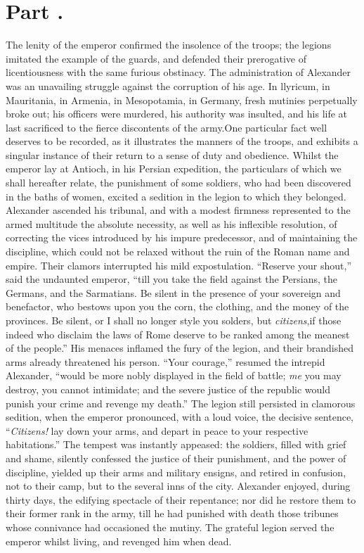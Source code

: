 \section{Part \thesection.}
\thispagestyle{simple}

The lenity of the emperor confirmed the insolence of the troops;
the legions imitated the example of the guards, and defended
their prerogative of licentiousness with the same furious
obstinacy. The administration of Alexander was an unavailing
struggle against the corruption of his age. In llyricum, in
Mauritania, in Armenia, in Mesopotamia, in Germany, fresh
mutinies perpetually broke out; his officers were murdered, his
authority was insulted, and his life at last sacrificed to the
fierce discontents of the army.\footnotemark[76] One particular fact well
deserves to be recorded, as it illustrates the manners of the
troops, and exhibits a singular instance of their return to a
sense of duty and obedience. Whilst the emperor lay at Antioch,
in his Persian expedition, the particulars of which we shall
hereafter relate, the punishment of some soldiers, who had been
discovered in the baths of women, excited a sedition in the
legion to which they belonged. Alexander ascended his tribunal,
and with a modest firmness represented to the armed multitude the
absolute necessity, as well as his inflexible resolution, of
correcting the vices introduced by his impure predecessor, and of
maintaining the discipline, which could not be relaxed without
the ruin of the Roman name and empire. Their clamors interrupted
his mild expostulation. “Reserve your shout,” said the undaunted
emperor, “till you take the field against the Persians, the
Germans, and the Sarmatians. Be silent in the presence of your
sovereign and benefactor, who bestows upon you the corn, the
clothing, and the money of the provinces. Be silent, or I shall
no longer style you solders, but \textit{citizens},\footnotemark[77] if those indeed
who disclaim the laws of Rome deserve to be ranked among the
meanest of the people.” His menaces inflamed the fury of the
legion, and their brandished arms already threatened his person.
“Your courage,” resumed the intrepid Alexander, “would be more
nobly displayed in the field of battle; \textit{me} you may destroy, you
cannot intimidate; and the severe justice of the republic would
punish your crime and revenge my death.” The legion still
persisted in clamorous sedition, when the emperor pronounced,
with a loud voice, the decisive sentence, “\textit{Citizens!} lay down
your arms, and depart in peace to your respective habitations.”
The tempest was instantly appeased: the soldiers, filled with
grief and shame, silently confessed the justice of their
punishment, and the power of discipline, yielded up their arms
and military ensigns, and retired in confusion, not to their
camp, but to the several inns of the city. Alexander enjoyed,
during thirty days, the edifying spectacle of their repentance;
nor did he restore them to their former rank in the army, till he
had punished with death those tribunes whose connivance had
occasioned the mutiny. The grateful legion served the emperor
whilst living, and revenged him when dead.\footnotemark[78]

